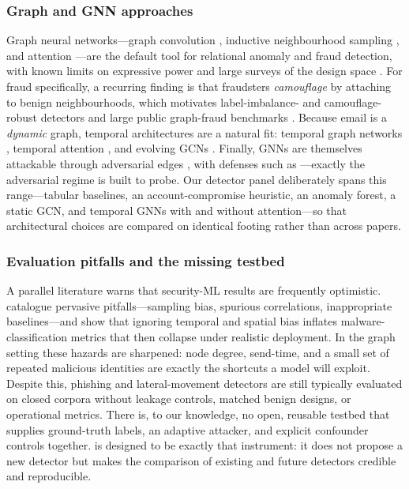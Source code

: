 \subsubsection{Graph and GNN approaches}
Graph neural networks---graph convolution \cite{kipf2017semisupervised}, inductive
neighbourhood sampling \cite{hamilton2017inductive}, and attention
\cite{velickovic2018graph}---are the default tool for relational anomaly and fraud detection,
with known limits on expressive power \cite{xu2019how} and large surveys of the design space
\cite{wu2021comprehensive,ma2021comprehensive,akoglu2015graph}. For fraud specifically, a
recurring finding is that fraudsters \emph{camouflage} by attaching to benign neighbourhoods,
which motivates label-imbalance- and camouflage-robust detectors
\cite{dou2020enhancing,liu2021pick,tang2022rethinking} and large public graph-fraud benchmarks
\cite{weber2019antimoney}. Because email is a \emph{dynamic} graph, temporal architectures are
a natural fit: temporal graph networks \cite{rossi2020temporal}, temporal attention
\cite{xu2020inductive}, and evolving GCNs \cite{pareja2020evolvegcn}. Finally, GNNs are
themselves attackable through adversarial edges \cite{zugner2018adversarial}, with defenses
such as \cite{zhang2020gnnguard}---exactly the adversarial regime \tool is built to probe. Our
detector panel deliberately spans this range---tabular baselines, an account-compromise
heuristic, an anomaly forest, a static GCN, and temporal GNNs with and without attention---so
that architectural choices are compared on identical footing rather than across papers.

\subsubsection{Evaluation pitfalls and the missing testbed}
A parallel literature warns that security-ML results are frequently optimistic.
\citet{arp2022dos} catalogue pervasive pitfalls---sampling bias, spurious correlations,
inappropriate baselines---and \citet{pendlebury2019tesseract} show that ignoring temporal
and spatial bias inflates malware-classification metrics that then collapse under realistic
deployment. In the graph setting these hazards are sharpened: node degree, send-time, and a
small set of repeated malicious identities are exactly the shortcuts a model will exploit.
Despite this, phishing and lateral-movement detectors are still typically evaluated on
closed corpora without leakage controls, matched benign designs, or operational metrics.
There is, to our knowledge, no open, reusable testbed that supplies ground-truth labels, an
adaptive attacker, and explicit confounder controls together. \tool is designed to be
exactly that instrument: it does not propose a new detector but makes the comparison of
existing and future detectors credible and reproducible.
